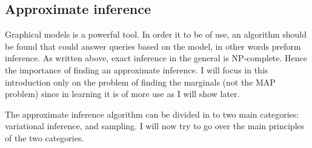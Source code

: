 \subsection{Approximate inference}
\label{sec:approx}
Graphical models is a powerful tool.
In order it to be of use, an algorithm should be found that could answer queries based on the model, in other words preform inference.
As written above, exact inference in the general is NP-complete.
Hence the importance of finding an approximate inference.
I will focus in this introduction only on the problem of finding the marginals (not the MAP problem) since in learning it is of more use as I will show later.

The approximate inference algorithm can be divided in to two main categories: variational inference, and sampling.
I will now try to go over the main principles of the two categories.
